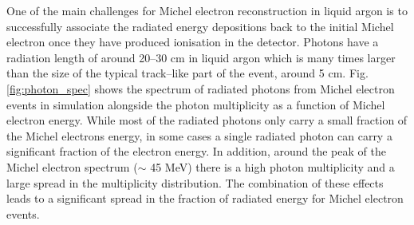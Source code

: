 One of the main challenges for Michel electron reconstruction in liquid argon is
to successfully associate the radiated energy depositions back to the initial
Michel electron once they have produced ionisation in the detector. Photons have
a radiation length of around 20--30 cm in liquid argon which is many times
larger than the size of the typical track--like part of the event, around 5 cm. 
Fig. \ref{fig:photon_spec} shows the spectrum of radiated photons from Michel 
electron events in \protodune{} simulation alongside the photon multiplicity 
as a function of Michel electron energy. While most of the radiated photons 
only carry a small fraction of the Michel electrons energy, in some cases a 
single radiated photon can carry a significant fraction of the electron 
energy. In addition, around the peak of the Michel electron spectrum ($\sim$
45 MeV) there is a high photon multiplicity and a large spread in the
multiplicity distribution. The combination of these effects leads to a
significant spread in the fraction of radiated energy for Michel electron
events.


